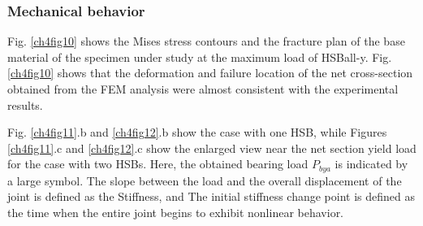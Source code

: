 \subsubsection{Mechanical behavior}

Fig. \ref{ch4fig10} shows the Mises stress contours and the fracture plan of the base material of the specimen under study at the maximum load of HSBall-y. Fig. \ref{ch4fig10} shows that the deformation and failure location of the net cross-section obtained from the FEM analysis were almost consistent with the experimental results. 

Fig. \ref{ch4fig11}.b and \ref{ch4fig12}.b show the case with one \ac{HSB}, while Figures \ref{ch4fig11}.c and \ref{ch4fig12}.c show the enlarged view near the net section yield load for the case with two \ac{HSB}s. Here, the obtained bearing load $P_{bya}$ is indicated by a large symbol. The slope between the load and the overall displacement of the joint is defined as the \ac{Stiffness}, and \ac{The initial stiffness change point} is defined as the time when the entire joint begins to exhibit nonlinear behavior.

